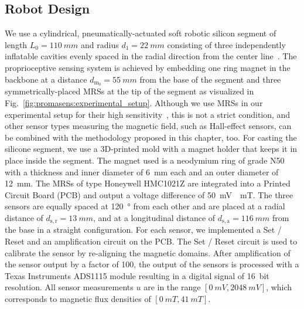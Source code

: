 \subsection{Robot Design}\label{sub:promasens:robot_design}
We use a cylindrical, pneumatically-actuated soft robotic silicon segment of length $L_{0}=\SI{110}{mm}$ and radius $d_1 = \SI{22}{mm}$ consisting of three independently inflatable cavities evenly spaced in the radial direction from the center line~\citep{marchese2015recipe}. 
%
The proprioceptive sensing system is achieved by embedding one ring magnet in the backbone at a distance $d_{\mathrm{m}_0} = \SI{55}{mm}$ from the base of the segment and three symmetrically-placed \glspl{MRS} at the tip of the segment as visualized in Fig.~\ref{fig:promasens:experimental_setup}. %
Although we use MRSs in our experimental setup for their high sensitivity~\citep{popovic2002bridging}, this is not a strict condition, and other sensor types measuring the magnetic field, such as Hall-effect sensors, can be combined with the methodology proposed in this chapter, too.
For casting the silicone segment, we use a 3D-printed mold with a magnet holder that keeps it in place inside the segment.
The magnet used is a neodymium ring of grade N50 with a thickness and inner diameter of \SI{6}{mm} each and an outer diameter of \SI{12}{mm}.
%
The MRSs of type Honeywell HMC1021Z are integrated into a Printed Circuit Board (PCB) and output a voltage difference of \SI{50}{mV \per mT}. %
The three sensors are equally spaced at \SI{120}{\degree} from each other and are placed at a radial distance of $d_{\mathrm{s},\mathrm{r}} = \SI{13}{mm}$, and at a longitudinal distance of $d_{\mathrm{s},\mathrm{a}} = \SI{116}{mm}$ from the base in a straight configuration.
For each sensor, we implemented a Set / Reset and an amplification circuit on the PCB.
The Set / Reset circuit is used to calibrate the sensor by re-aligning the magnetic domains. After amplification of the sensor output by a factor of 100, the output of the sensors is processed with a Texas Instruments ADS1115 module %
resulting in a digital signal of \SI{16}{bit} resolution. All sensor measurements $u$ are in the range $[\SI{0}{mV}, \SI{2048}{mV}]$, which corresponds to magnetic flux densities of  $[\SI{0}{mT}, \SI{41}{mT}]$.

